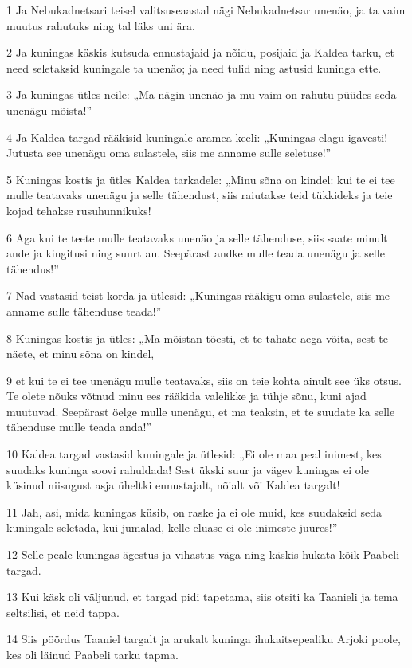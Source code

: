 \par 1 Ja Nebukadnetsari teisel valitsuseaastal nägi Nebukadnetsar unenäo, ja ta vaim muutus rahutuks ning tal läks uni ära.
\par 2 Ja kuningas käskis kutsuda ennustajaid ja nõidu, posijaid ja Kaldea tarku, et need seletaksid kuningale ta unenäo; ja need tulid ning astusid kuninga ette.
\par 3 Ja kuningas ütles neile: „Ma nägin unenäo ja mu vaim on rahutu püüdes seda unenägu mõista!”
\par 4 Ja Kaldea targad rääkisid kuningale aramea keeli: „Kuningas elagu igavesti! Jutusta see unenägu oma sulastele, siis me anname sulle seletuse!”
\par 5 Kuningas kostis ja ütles Kaldea tarkadele: „Minu sõna on kindel: kui te ei tee mulle teatavaks unenägu ja selle tähendust, siis raiutakse teid tükkideks ja teie kojad tehakse rusuhunnikuks!
\par 6 Aga kui te teete mulle teatavaks unenäo ja selle tähenduse, siis saate minult ande ja kingitusi ning suurt au. Seepärast andke mulle teada unenägu ja selle tähendus!”
\par 7 Nad vastasid teist korda ja ütlesid: „Kuningas rääkigu oma sulastele, siis me anname sulle tähenduse teada!”
\par 8 Kuningas kostis ja ütles: „Ma mõistan tõesti, et te tahate aega võita, sest te näete, et minu sõna on kindel,
\par 9 et kui te ei tee unenägu mulle teatavaks, siis on teie kohta ainult see üks otsus. Te olete nõuks võtnud minu ees rääkida valelikke ja tühje sõnu, kuni ajad muutuvad. Seepärast öelge mulle unenägu, et ma teaksin, et te suudate ka selle tähenduse mulle teada anda!”
\par 10 Kaldea targad vastasid kuningale ja ütlesid: „Ei ole maa peal inimest, kes suudaks kuninga soovi rahuldada! Sest ükski suur ja vägev kuningas ei ole küsinud niisugust asja üheltki ennustajalt, nõialt või Kaldea targalt!
\par 11 Jah, asi, mida kuningas küsib, on raske ja ei ole muid, kes suudaksid seda kuningale seletada, kui jumalad, kelle eluase ei ole inimeste juures!”
\par 12 Selle peale kuningas ägestus ja vihastus väga ning käskis hukata kõik Paabeli targad.
\par 13 Kui käsk oli väljunud, et targad pidi tapetama, siis otsiti ka Taanieli ja tema seltsilisi, et neid tappa.
\par 14 Siis pöördus Taaniel targalt ja arukalt kuninga ihukaitsepealiku Arjoki poole, kes oli läinud Paabeli tarku tapma.
